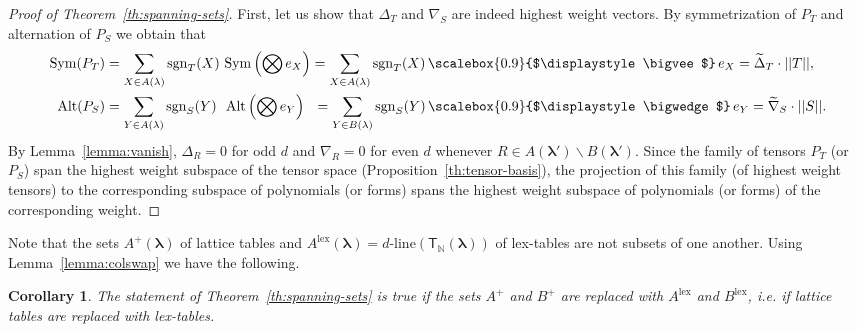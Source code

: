 \documentclass[12pt, reqno]{amsart}
\newtheorem{lemma}[theorem]{Lemma}
\newtheorem{corollary}[theorem]{Corollary}
\theoremstyle{definition}
\newcommand{\sgn}{\mathrm{sgn}}
\newcommand{\Deltaw}{\widetilde{\Delta}}
\newcommand{\nablaw}{\widetilde{\nabla}}
\let\oldbigwedge\bigwedge
\let\oldbigvee\bigvee
\renewcommand{\bigwedge}{
  \mathop{
    \vcenter{
      \hbox{\scalebox{0.9}{$\displaystyle\oldbigwedge$}}
    }
  }
}
\renewcommand{\bigvee}{
  \mathop{
    \vcenter{
      \hbox{\scalebox{0.9}{$\displaystyle\oldbigvee$}}
    }
  }
}
\begin{document}
\begin{proof}[Proof of Theorem~\ref{th:spanning-sets}]
    First, let us show that $\Delta_T$ and $\nabla_S$ are indeed highest weight vectors. By symmetrization of $P_T$ and alternation of $P_S$ we obtain that 
    \begin{align*}
        \mathrm{Sym}(P_T) 
        &= \sum_{X \in A(\lambda)} \sgn_T(X)\ \mathrm{Sym}
            \left(\bigotimes e_X\right)
        = \sum_{X \in A(\lambda)} \sgn_T(X) \bigvee e_X = \Deltaw_T \cdot ||T||,
        \\
        \mathrm{Alt}(P_S) 
        &= \sum_{Y \in A(\lambda)} \sgn_S(Y) \ \ \mathrm{Alt}\left(\bigotimes e_Y\right) \ \ 
        = \sum_{Y \in B(\lambda)} \sgn_S(Y) \bigwedge e_Y = \nablaw_S \cdot ||S||.
    \end{align*} 
    By Lemma~\ref{lemma:vanish}, $\Delta_R = 0$ for odd $d$ and $\nabla_R = 0$ for even $d$ whenever $R \in A(\pmb{\lambda'}) \backslash B(\pmb{\lambda'})$. Since the family of tensors $P_T$ (or $P_S$) span the highest weight subspace of the tensor space (Proposition~\ref{th:tensor-basis}),  the projection of this family (of highest weight tensors) to the corresponding subspace of polynomials (or forms) spans the highest weight subspace of polynomials (or forms) of the corresponding weight.
\end{proof}

Note that the sets $A^+(\pmb{\lambda})$ of lattice tables and $A^{\mathrm{lex}}(\pmb{\lambda}) = d\text{-line}(\mathsf{T}_\mathbb{N}(\pmb{\lambda}))$ of lex-tables are not subsets of one another. Using Lemma~\ref{lemma:colswap} we have the following. 

\begin{corollary}
    The statement of Theorem~\ref{th:spanning-sets} is true if the sets $A^+$ and $B^+$ are replaced with $A^\mathrm{lex}$ and $B^\mathrm{lex}$, i.e. if lattice tables are replaced with lex-tables.
\end{corollary}
\end{document}
